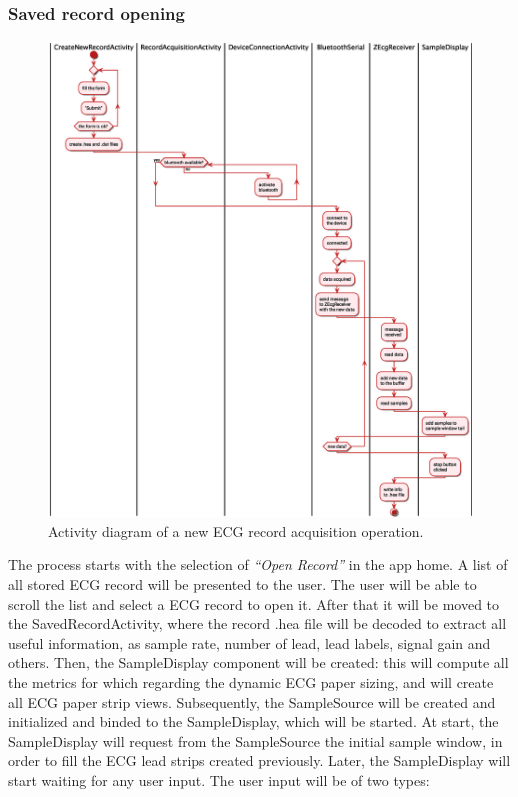 \subsubsection{Saved record opening}
\begin{figure}[ht!]
	\centering
	\includegraphics[width=\linewidth]{figures/ch9/13.eps}
	\caption{Activity diagram of a new ECG record acquisition operation.}
	\label{fig9.13}
\end{figure}
The process starts with the selection of \textit{“Open Record”} in the app home. A list of all stored ECG record will be presented to the user. The user will be able to scroll the list and select a ECG record to open it. After that it will be moved to the SavedRecordActivity, where the record .hea file will be decoded to extract all useful information, as sample rate, number of lead, lead labels, signal gain and others. Then, the SampleDisplay component will be created: this will compute all the metrics for which regarding the dynamic ECG paper sizing, and will create all ECG paper strip views. Subsequently, the SampleSource will be created and initialized and binded to the SampleDisplay, which will be started. At start, the SampleDisplay will request from the SampleSource the initial sample window, in order to fill the ECG lead strips created previously. Later, the SampleDisplay will start waiting for any user input. The user input will be of two types:

